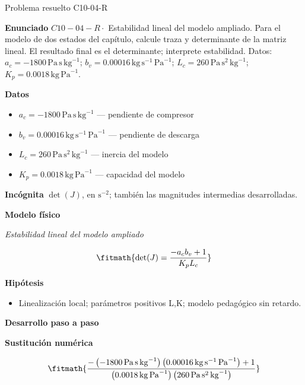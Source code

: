 \documentclass[10pt,openany]{book}
\begin{document}
\begin{studiumworked}{Problema resuelto C10-04-R}


\noindent\textbf{Enunciado}
\(C10-04-R \cdot\) Estabilidad lineal del modelo ampliado. Para el modelo de dos estados del capítulo, calcule traza y determinante de la matriz lineal. El resultado final es el determinante; interprete estabilidad. Datos: \(a_c=-1800\, \mathrm{Pa}\,\mathrm{s}\,\mathrm{kg}^{-1}\); \(b_v=0.00016\, \mathrm{kg}\,\mathrm{s}^{-1}\,\mathrm{Pa}^{-1}\); \(L_c=260\, \mathrm{Pa}\,\mathrm{s}^{2}\,\mathrm{kg}^{-1}\); \(K_p=0.0018\, \mathrm{kg}\,\mathrm{Pa}^{-1}\).

\noindent\textbf{Datos}
\begin{itemize}
\item $a_c = -1800\,\mathrm{Pa}\,\mathrm{s}\,\mathrm{kg}^{-1}$ — pendiente de compresor
\item $b_v = 0.00016\,\mathrm{kg}\,\mathrm{s}^{-1}\,\mathrm{Pa}^{-1}$ — pendiente de descarga
\item $L_c = 260\,\mathrm{Pa}\,\mathrm{s}^{2}\,\mathrm{kg}^{-1}$ — inercia del modelo
\item $K_p = 0.0018\,\mathrm{kg}\,\mathrm{Pa}^{-1}$ — capacidad del modelo
\end{itemize}

\noindent\textbf{Incógnita}
$\det(J)$, en $\mathrm{s^{-2}}$; también las magnitudes intermedias desarrolladas.

\noindent\textbf{Modelo físico}

\noindent\textit{Estabilidad lineal del modelo ampliado}

\[
\fitmath{\det(J)=\frac{- a_c b_v + 1}{K_p L_c}}
\]

\noindent\textbf{Hipótesis}
\begin{itemize}
\item Linealización local; parámetros positivos L,K; modelo pedagógico sin retardo.
\end{itemize}

\noindent\textbf{Desarrollo paso a paso}



\noindent\textbf{Sustitución numérica}

\[
\fitmath{\frac{- \left(-1800\,\mathrm{Pa}\,\mathrm{s}\,\mathrm{kg}^{-1}\right) \left(0.00016\,\mathrm{kg}\,\mathrm{s}^{-1}\,\mathrm{Pa}^{-1}\right) + 1}{\left(0.0018\,\mathrm{kg}\,\mathrm{Pa}^{-1}\right) \left(260\,\mathrm{Pa}\,\mathrm{s}^{2}\,\mathrm{kg}^{-1}\right)}}
\]


\end{studiumworked}
\end{document}
